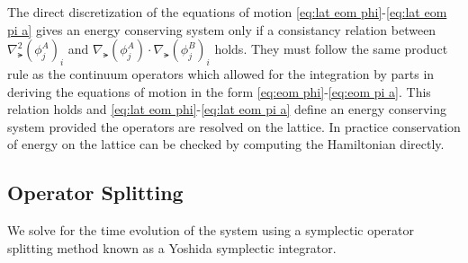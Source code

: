 The direct discretization of the equations of motion \eqref{eq:lat eom phi}-\eqref{eq:lat eom pi a} gives an energy conserving system only if a consistancy relation between $\nabla^2_\lat(\phi^A_j)_i$ and $\nabla_\lat(\phi^A_j)\cdot\nabla_\lat(\phi^B_j)_i$ holds.
They must follow the same product rule as the continuum operators which allowed for the integration by parts in deriving the equations of motion in the form \eqref{eq:eom phi}-\eqref{eq:eom pi a}.
This relation holds and \eqref{eq:lat eom phi}-\eqref{eq:lat eom pi a} define an energy conserving system provided the operators are resolved on the lattice.
In practice conservation of energy on the lattice can be checked by computing the Hamiltonian directly.

\subsection{Operator Splitting}
We solve for the time evolution of the system using a symplectic operator splitting method known as a Yoshida symplectic integrator.

